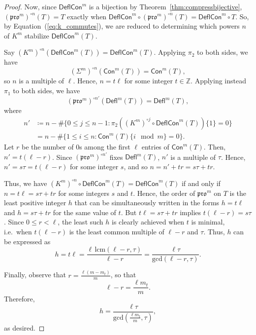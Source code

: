 \documentclass[12pt]{amsart}
\theoremstyle{definition}
\theoremstyle{remark}
\numberwithin{equation}{section}
\newcommand{\pro}{\mathfrak{pro}}
\newcommand{\deflate}{\ensuremath{\mathsf{Defl}}}
\newcommand{\content}{\ensuremath{\mathsf{Con}}}
\newcommand{\compress}{\ensuremath{\mathsf{DeflCon}}}
\begin{document}
\begin{proof}
Now, since $\compress^m$ is a bijection by Theorem~\ref{thm:compressbijective}, $(\pro^m)^{\circ n}(T) = T$ exactly when $\compress^m \circ (\pro^m)^{\circ n}(T) = \compress^m \circ T$. So, by Equation~(\ref{eq:k_commutes}), we are reduced to determining which powers $n$ of $K^m$ stabilize $\compress^m(T)$.
 

 
Say $(K^m)^{\circ n}(\compress^m(T)) = \compress^m(T)$. Applying $\pi_2$ to both sides, we have \[ (\Sigma^m)^{\circ n}(\content^m(T)) = \content^m(T), \] so $n$ is a multiple of $\ell$. Hence, $n = t \ell$ for some integer $t \in \mathbb{Z}$.  Applying instead $\pi_1$ to both sides, we have \[ (\pro^m)^{\circ n'}(\deflate^m(T)) = \deflate^m(T), \] where 
\begin{align*}
n' &\coloneqq n - \# \{ 0 \leq j \leq n-1 : \pi_2 ((K^m)^{\circ j} \circ \compress^m(T)) \lbrace 1 \rbrace = 0\} \\
&= n - \#  \{ 1 \leq i \leq n : \content^m(T) \lbrace i \mod m \rbrace = 0\}.
\end{align*}
Let $r$ be the number of $0$s among the first $\ell$ entries of $\content^m(T)$. Then, $n' = t(\ell - r)$. Since $(\pro^m)^{\circ n'}$ fixes $\deflate^m(T)$, $n'$ is a multiple of $\tau$. Hence, $n' = s \tau = t(\ell - r)$ for some integer $s$, and so $n = n' + tr = s\tau + tr$.

Thus, we have $(K^m)^{\circ n}  \circ \compress^m(T) = \compress^m(T)$ if and only if $n = t \ell = s \tau + t  r$ for some integers $s$ and $t$. Hence, the order of $\pro^m$ on $T$ is the least positive integer $h$ that can be simultaneously written in the forms $h = t \ell$ and $h=s \tau + t r$ for the same value of $t$. But $t \ell = s\tau + tr$ implies $t(\ell-r) = s\tau$. Since $0 \leq r < \ell$, the least such $h$ is clearly achieved when $t$ is minimal, i.e.\ when $t(\ell-r)$ is the least common multiple of $\ell-r$ and $\tau$. Thus, $h$ can be expressed as 
\begin{equation}\label{eq:period}
h = t \ell = \frac{\ell \, \text{lcm}(\ell-r,\tau)}{\ell-r} = \frac{\ell \tau}{\text{gcd}(\ell-r,\tau)}.
\end{equation}

Finally, observe that $r = \frac{\ell (m-m_t)}{m}$, so that \[ \ell - r = \frac{\ell m_t}{m}.\]
Therefore,
\[ h = \frac{\ell \tau}{\text{gcd}(\frac{\ell m_t}{m},\tau)}, \]
as desired. 
\end{proof}
\end{document}
